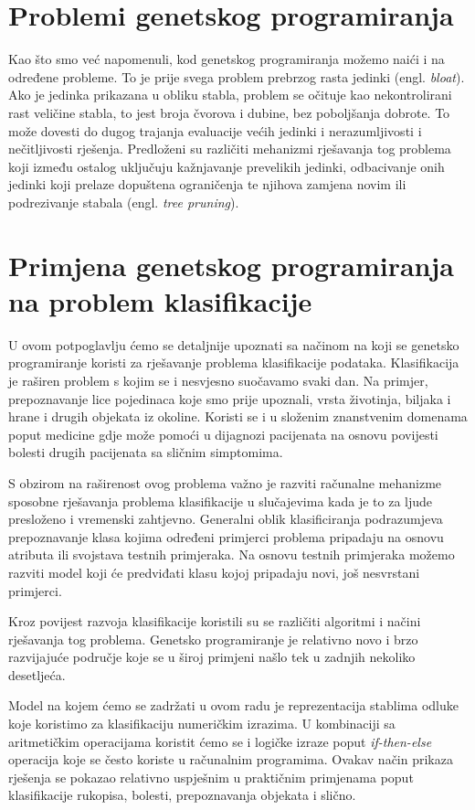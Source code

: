 \documentclass[times, utf8, zavrsni]{fer}
\begin{document}
\section{Problemi genetskog programiranja}
Kao što smo već napomenuli, kod genetskog programiranja možemo naići i na određene probleme. To je prije svega problem prebrzog rasta jedinki (engl. \textit {bloat}). Ako je jedinka prikazana u obliku stabla, problem se očituje kao nekontrolirani rast veličine stabla, to jest broja čvorova i dubine, bez poboljšanja dobrote. To može dovesti do dugog trajanja evaluacije većih jedinki i nerazumljivosti i nečitljivosti rješenja. Predloženi su različiti mehanizmi rješavanja tog problema koji između ostalog uključuju kažnjavanje prevelikih jedinki, odbacivanje onih jedinki koji prelaze dopuštena ograničenja te njihova zamjena novim ili podrezivanje stabala (engl. \textit{tree pruning}). 
\section{Primjena genetskog programiranja na problem klasifikacije}
U ovom potpoglavlju ćemo se detaljnije upoznati sa načinom na koji se genetsko programiranje koristi za rješavanje problema klasifikacije podataka. Klasifikacija je raširen problem s kojim se i nesvjesno suočavamo svaki dan. Na primjer, prepoznavanje lice pojedinaca koje smo prije upoznali, vrsta životinja, biljaka i hrane i drugih objekata iz okoline. Koristi se i u složenim znanstvenim domenama poput medicine gdje može pomoći u dijagnozi pacijenata na osnovu povijesti bolesti drugih pacijenata sa sličnim simptomima. 

S obzirom na raširenost ovog problema važno je razviti računalne mehanizme sposobne rješavanja problema klasifikacije u slučajevima kada je to za ljude presloženo i vremenski zahtjevno. Generalni oblik klasificiranja podrazumjeva prepoznavanje klasa kojima određeni primjerci problema pripadaju na osnovu atributa ili svojstava testnih primjeraka. Na osnovu testnih primjeraka možemo razviti model koji će predviđati klasu kojoj pripadaju novi, još nesvrstani primjerci.

Kroz povijest razvoja klasifikacije koristili su se različiti algoritmi i načini rješavanja tog problema. Genetsko programiranje je relativno novo i brzo razvijajuće područje koje se u široj primjeni našlo tek u zadnjih nekoliko desetljeća.

Model na kojem ćemo se zadržati u ovom radu je reprezentacija stablima odluke koje koristimo za klasifikaciju numeričkim izrazima. U kombinaciji sa aritmetičkim operacijama koristit ćemo se i logičke izraze poput \textit{if-then-else} operacija koje se često koriste u računalnim programima. Ovakav način prikaza rješenja se pokazao relativno uspješnim u praktičnim primjenama poput klasifikacije rukopisa, bolesti, prepoznavanja objekata i slično. 
\end{document}
